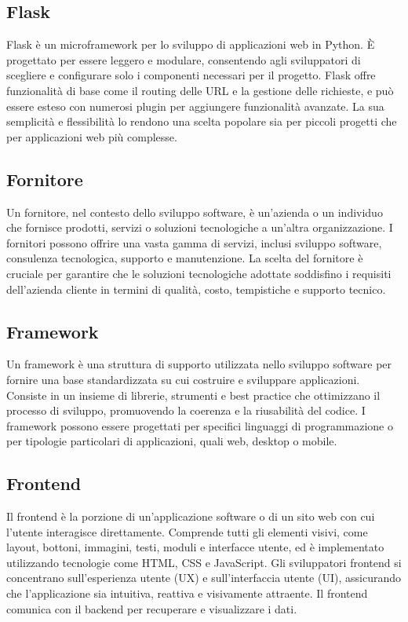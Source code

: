 \vspace{2em}
\subsection*{Flask}
\par Flask è un microframework per lo sviluppo di applicazioni web in Python. È progettato per essere leggero e modulare, consentendo agli sviluppatori di scegliere e configurare solo i componenti necessari per il progetto. Flask offre funzionalità di base come il routing delle URL e la gestione delle richieste, e può essere esteso con numerosi plugin per aggiungere funzionalità avanzate. La sua semplicità e flessibilità lo rendono una scelta popolare sia per piccoli progetti che per applicazioni web più complesse.

\vspace{2em}
\subsection*{Fornitore}
\par Un fornitore, nel contesto dello sviluppo software, è un'azienda o un individuo che fornisce prodotti, servizi o soluzioni tecnologiche a un'altra organizzazione. I fornitori possono offrire una vasta gamma di servizi, inclusi sviluppo software, consulenza tecnologica, supporto e manutenzione. La scelta del fornitore è cruciale per garantire che le soluzioni tecnologiche adottate soddisfino i requisiti dell'azienda cliente in termini di qualità, costo, tempistiche e supporto tecnico.

\vspace{2em}
\subsection*{Framework}
\par Un framework è una struttura di supporto utilizzata nello sviluppo software per fornire una base standardizzata su cui costruire e sviluppare applicazioni. Consiste in un insieme di librerie, strumenti e best practice che ottimizzano il processo di sviluppo, promuovendo la coerenza e la riusabilità del codice. I framework possono essere progettati per specifici linguaggi di programmazione o per tipologie particolari di applicazioni, quali web, desktop o mobile.

\vspace{2em}
\subsection*{Frontend}
\par Il frontend è la porzione di un'applicazione software o di un sito web con cui l'utente interagisce direttamente. Comprende tutti gli elementi visivi, come layout, bottoni, immagini, testi, moduli e interfacce utente, ed è implementato utilizzando tecnologie come HTML, CSS e JavaScript. Gli sviluppatori frontend si concentrano sull'esperienza utente (UX) e sull'interfaccia utente (UI), assicurando che l'applicazione sia intuitiva, reattiva e visivamente attraente. Il frontend comunica con il backend per recuperare e visualizzare i dati.
